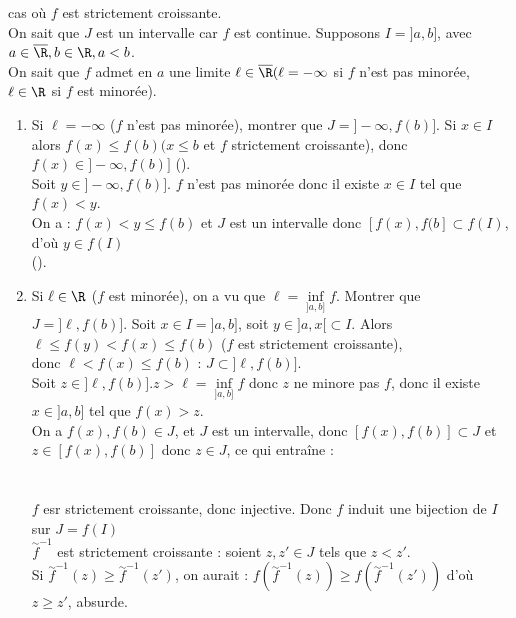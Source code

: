 \documentclass[12pt,a4paper]{report}
\begin{document}
\begin{demo}{}
cas où $f$ est strictement croissante. \\
On sait que $J$ est un intervalle car $f$ est continue. Supposons $I = ]a,b]$, avec $a \in \overline{\R}, b \in \R, a<b$. \\
On sait que $f$ admet en $a$ une limite $\ell \in \overline{\R} (\ell = -\infty$ si $f$ n'est pas minorée, $\ell \in \R$ si $f$ est minorée).
\begin{enumerate}
	\item Si $\ell = -\infty$ ($f$ n'est pas minorée), montrer que $J = ]-\infty,f(b)]$.
		Si $x \in I$ alors $f(x) \leq f(b) (x \leq b$ et $f$ strictement croissante), donc $f(x) \in ]-\infty,f(b)]$ (\strong{$J \subset ]-\infty,f(b)]$}).\\
		Soit $y \in ]-\infty,f(b)]$. $f$ n'est pas minorée donc il existe $x \in I$ tel que $f(x) < y$. \\
		On a : $f(x) < y \leq f(b)$ et $J$ est un intervalle donc $[f(x),f(b] \subset f(I)$, d'où $y \in f(I)$ \\
		(\strong{$]-\infty,f(b) \subset J$}).
	\item  Si $\ell \in \R$ ($f$ est minorée), on a vu que $\ell = \underset{]a,b]}{\inf} f$.
		Montrer que $J = ]\ell,f(b)]$.
		Soit $x \in I = ]a,b]$, soit $y \in ]a,x[ \subset I$. Alors $\ell \leq f(y) < f(x) \leq f(b)$ ($f$ est strictement croissante), \\
		donc $\ell < f(x) \leq f(b)$ : $J \subset ]\ell,f(b)]$. \\
		Soit $z \in ]\ell, f(b)]. z > \ell = \underset{]a,b]}{\inf} f$ donc $z$ ne minore pas $f$, donc il existe $x \in ]a,b]$ tel que $f(x)>z$. \\
		On a $f(x),f(b) \in J$, et $J$ est un intervalle, donc $[f(x),f(b)] \subset J$ et $z \in [f(x),f(b)]$ donc $z \in J$, ce qui entraîne : \\
		\strong{$]\ell,f(b)] \subset J$} \\ \\
$f$ esr strictement croissante, donc injective. Donc $f$ induit une bijection de $I$ sur $J = f(I)$ \ie {} \\
$\overset{\sim}{f}^{-1}$ est strictement croissante : soient $z,z' \in J$ tels que $z<z'$. \\
Si $\overset{\sim}{f}^{-1}(z) \geq \overset{\sim}{f}^{-1}(z')$, on aurait : $f\left(\overset{\sim}{f}^{-1}(z)\right) \geq f\left(\overset{\sim}{f}^{-1}(z')\right)$ d'où $z\geq z'$, absurde. \\
\end{enumerate}
\end{demo}
\end{document}
